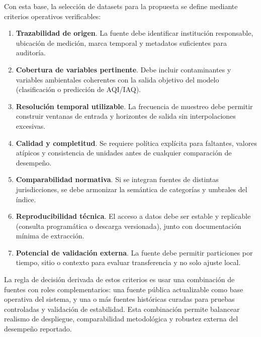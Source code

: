 Con esta base, la selección de datasets para la propuesta se define mediante criterios operativos verificables:
\begin{enumerate}
\item \textbf{Trazabilidad de origen}. La fuente debe identificar institución responsable, ubicación de medición, marca temporal y metadatos suficientes para auditoría.
\item \textbf{Cobertura de variables pertinente}. Debe incluir contaminantes y variables ambientales coherentes con la salida objetivo del modelo (clasificación o predicción de AQI/IAQ).
\item \textbf{Resolución temporal utilizable}. La frecuencia de muestreo debe permitir construir ventanas de entrada y horizontes de salida sin interpolaciones excesivas.
\item \textbf{Calidad y completitud}. Se requiere política explícita para faltantes, valores atípicos y consistencia de unidades antes de cualquier comparación de desempeño.
\item \textbf{Comparabilidad normativa}. Si se integran fuentes de distintas jurisdicciones, se debe armonizar la semántica de categorías y umbrales del índice.
\item \textbf{Reproducibilidad técnica}. El acceso a datos debe ser estable y replicable (consulta programática o descarga versionada), junto con documentación mínima de extracción.
\item \textbf{Potencial de validación externa}. La fuente debe permitir particiones por tiempo, sitio o contexto para evaluar transferencia y no solo ajuste local.
\end{enumerate}

La regla de decisión derivada de estos criterios es usar una combinación de fuentes con roles complementarios: una fuente pública actualizable como base operativa del sistema, y una o más fuentes históricas curadas para pruebas controladas y validación de estabilidad. Esta combinación permite balancear realismo de despliegue, comparabilidad metodológica y robustez externa del desempeño reportado.

